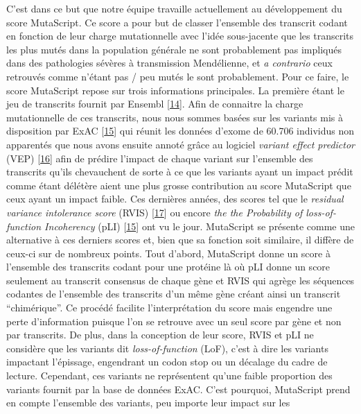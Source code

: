 \documentclass[12pt,twoside]{ugathesis}
\begin{document}
\newpage

C'est dans ce but que notre équipe travaille actuellement au
développement du score MutaScript. Ce score a pour but de classer
l'ensemble des transcrit codant en fonction de leur charge mutationnelle
avec l'idée sous-jacente que les transcrits les plus mutés dans la
population générale ne sont probablement pas impliqués dans des
pathologies sévères à transmission Mendélienne, et \emph{a contrario}
ceux retrouvés comme n'étant pas / peu mutés le sont probablement. Pour
ce faire, le score MutaScript repose sur trois informations principales.
La première étant le jeu de transcrits fournit par Ensembl
{[}\protect\hyperlink{ref-Aken2017}{14}{]}. Afin de connaitre la charge
mutationnelle de ces transcrits, nous nous sommes basées sur les
variants mis à disposition par ExAC
{[}\protect\hyperlink{ref-Lek2016}{15}{]} qui réunit les données d'exome
de 60.706 individus non apparentés que nous avons ensuite annoté grâce
au logiciel \emph{variant effect predictor} (VEP)
{[}\protect\hyperlink{ref-McLaren2016}{16}{]} afin de prédire l'impact
de chaque variant sur l'ensemble des transcrits qu'ils chevauchent de
sorte à ce que les variants ayant un impact prédit comme étant délétère
aient une plus grosse contribution au score MutaScript que ceux ayant un
impact faible. Ces dernières années, des scores tel que le
\emph{residual variance intolerance score} (RVIS)
{[}\protect\hyperlink{ref-Petrovski2013}{17}{]} ou encore \emph{the the
Probability of loss-of-function Incoherency} (pLI)
{[}\protect\hyperlink{ref-Lek2016}{15}{]} ont vu le jour. MutaScript se
présente comme une alternative à ces derniers scores et, bien que sa
fonction soit similaire, il diffère de ceux-ci sur de nombreux points.
Tout d'abord, MutaScript donne un score à l'ensemble des transcrits
codant pour une protéine là où pLI donne un score seulement au transcrit
consensus de chaque gène et RVIS qui agrège les séquences codantes de
l'ensemble des transcrits d'un même gène créant ainsi un transcrit
``chimérique''. Ce procédé facilite l'interprétation du score mais
engendre une perte d'information puisque l'on se retrouve avec un seul
score par gène et non par transcrits. De plus, dans la conception de
leur score, RVIS et pLI ne considère que les variants dit
\emph{loss-of-function} (LoF), c'est à dire les variants impactant
l'épissage, engendrant un codon stop ou un décalage du cadre de lecture.
Cependant, ces variants ne représentent qu'une faible proportion des
variants fournit par la base de données ExAC. C'est pourquoi, MutaScript
prend en compte l'ensemble des variants, peu importe leur impact sur les
\end{document}
